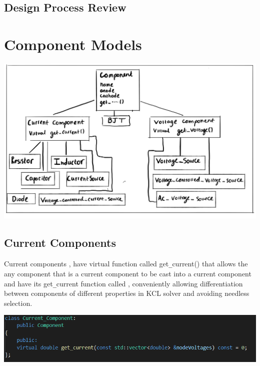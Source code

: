 \documentclass{article}
\begin{document}
\subsection{Design Process Review}


\newpage



\section{Component Models}
\includegraphics[width=15cm]{images/Comphpp1.jpg}
\subsection{Current Components}
Current components , have virtual function called get\verb|_|current() that allows the any component that is a current component to be cast into a current component and have its get\verb|_|current function called , conveniently allowing differentiation between components of different properties in KCL solver and avoiding needless selection.
\medbreak

\includegraphics[width=15cm]{images/Current_Component.PNG}
\end{document}
